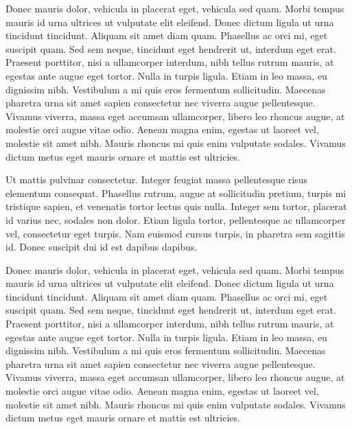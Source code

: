 \documentclass{FramateX}
\begin{document}
Donec mauris dolor, vehicula in placerat eget, vehicula sed quam. Morbi tempus mauris id urna ultrices ut vulputate elit eleifend. Donec dictum ligula ut urna tincidunt tincidunt. Aliquam sit amet diam quam. Phasellus ac orci mi, eget suscipit quam. Sed sem neque, tincidunt eget hendrerit ut, interdum eget erat. Praesent porttitor, nisi a ullamcorper interdum, nibh tellus rutrum mauris, at egestas ante augue eget tortor. Nulla in turpis ligula. Etiam in leo massa, eu dignissim nibh. Vestibulum a mi quis eros fermentum sollicitudin. Maecenas pharetra urna sit amet sapien consectetur nec viverra augue pellentesque. Vivamus viverra, massa eget accumsan ullamcorper, libero leo rhoncus augue, at molestie orci augue vitae odio. Aenean magna enim, egestas ut laoreet vel, molestie sit amet nibh. Mauris rhoncus mi quis enim vulputate sodales. Vivamus dictum metus eget mauris ornare et mattis est ultricies.


Ut mattis pulvinar consectetur. Integer feugiat massa pellentesque risus elementum consequat. Phasellus rutrum, augue at sollicitudin pretium, turpis mi tristique sapien, et venenatis tortor lectus quis nulla. Integer sem tortor, placerat id varius nec, sodales non dolor. Etiam ligula tortor, pellentesque ac ullamcorper vel, consectetur eget turpis. Nam euismod cursus turpis, in pharetra sem sagittis id. Donec suscipit dui id est dapibus dapibus.

Donec mauris dolor, vehicula in placerat eget, vehicula sed quam. Morbi tempus mauris id urna ultrices ut vulputate elit eleifend. Donec dictum ligula ut urna tincidunt tincidunt. Aliquam sit amet diam quam. Phasellus ac orci mi, eget suscipit quam. Sed sem neque, tincidunt eget hendrerit ut, interdum eget erat. Praesent porttitor, nisi a ullamcorper interdum, nibh tellus rutrum mauris, at egestas ante augue eget tortor. Nulla in turpis ligula. Etiam in leo massa, eu dignissim nibh. Vestibulum a mi quis eros fermentum sollicitudin. Maecenas pharetra urna sit amet sapien consectetur nec viverra augue pellentesque. Vivamus viverra, massa eget accumsan ullamcorper, libero leo rhoncus augue, at molestie orci augue vitae odio. Aenean magna enim, egestas ut laoreet vel, molestie sit amet nibh. Mauris rhoncus mi quis enim vulputate sodales. Vivamus dictum metus eget mauris ornare et mattis est ultricies.

                        


                    

\mainmatter
                        
\end{document}
